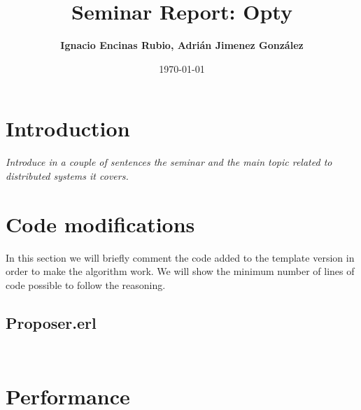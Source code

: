\documentclass[a4paper, 10pt]{article}
\title{Seminar Report: Opty}
\author{\textbf{Ignacio Encinas Rubio, Adrián Jimenez González}}
\date{\normalsize\today{}}
\begin{document}
\maketitle

  
  

\section{Introduction}


\textit{Introduce in a couple of sentences the seminar and the main topic related to distributed systems it covers.}

\section{Code modifications}

   In this section we will briefly comment the code added to the template version in order to
   make the algorithm work. We will show the minimum number of lines of code possible to follow the reasoning.

  \subsection{Proposer.erl}

    \begin{minipage}{.45\textwidth}
	\begin{lstlisting}[language=erlang, caption={Template}]
	\end{lstlisting}
    \end{minipage}\hfill
    \begin{minipage}{.45\textwidth}
	\begin{lstlisting}[language=erlang, caption={Filled version}]
	\end{lstlisting}
    \end{minipage}

\clearpage
\section{Performance}
\end{document}
